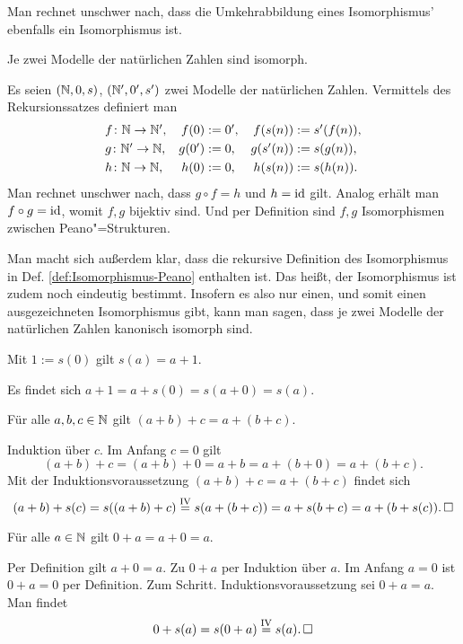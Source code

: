 \noindent
Man rechnet unschwer nach, dass die Umkehrabbildung eines Isomorphismus'
ebenfalls ein Isomorphismus ist.

\begin{Satz}\newlinefirst
Je zwei Modelle der natürlichen Zahlen sind isomorph.
\end{Satz}
\begin{Beweis}
Es seien $(\mathbb N,0,s)$, $(\mathbb N',0',s')$ zwei Modelle der natürlichen Zahlen.
Vermittels des Rekursionssatzes definiert man
\[\begin{array}{lr@{\;}lr@{\;}l}
f\colon\N\to\N', & f(0) &:= 0', & f(s(n)) &:= s'(f(n)),\\[3pt]
g\colon\N'\to\N, & g(0') &:= 0, & g(s'(n)) &:= s(g(n)),\\[3pt]
h\colon\N\to\N, & h(0) &:= 0, & h(s(n)) &:= s(h(n)).
\end{array}\]
Man rechnet unschwer nach, dass $g\circ f = h$ und $h = \operatorname{id}$ gilt.
Analog erhält man $f\circ g = \operatorname{id}$, womit $f,g$ bijektiv sind.
Und per Definition sind $f,g$ Isomorphismen zwischen Peano"=Strukturen.\,\qedsymbol
\end{Beweis}

\noindent
Man macht sich außerdem klar, dass die rekursive Definition des
Isomorphismus in Def. \ref{def:Isomorphismus-Peano} enthalten ist.
Das heißt, der Isomorphismus ist zudem noch eindeutig bestimmt.
Insofern es also nur einen, und somit einen ausgezeichneten Isomorphismus
gibt, kann man sagen, dass je zwei Modelle der natürlichen Zahlen
kanonisch isomorph sind.

\begin{Satz}
Mit $1:=s(0)$ gilt $s(a)=a+1$.
\end{Satz}
\begin{Beweis}
Es findet sich $a+1 = a+s(0) = s(a+0) = s(a)$.\,\qedsymbol
\end{Beweis}

\begin{Satz}\newlinefirst
Für alle $a,b,c\in\mathbb N$ gilt $(a+b)+c = a+(b+c)$.
\end{Satz}
\begin{Beweis}
Induktion über $c$. Im Anfang $c=0$ gilt
\[(a+b)+c = (a+b)+0 = a+b = a+(b+0) = a+(b+c).\]
Mit der Induktionsvoraussetzung $(a+b)+c = a+(b+c)$ findet sich
\[(a+b)+s(c) = s((a+b)+c) \stackrel{\mathrm{IV}}= s(a+(b+c))
= a+s(b+c) = a+(b+s(c)).\,\Box\]
\end{Beweis}

\begin{Satz}%
\label{nat-zero}\newlinefirst
Für alle $a\in\mathbb N$ gilt $0+a = a+0 = a$.
\end{Satz}
\begin{Beweis}
Per Definition gilt $a+0=a$. Zu $0+a$ per Induktion über $a$.
Im Anfang $a=0$ ist $0+a = 0$ per Definition. Zum Schritt.
Induktionsvoraussetzung sei $0+a=a$. Man findet
\[0+s(a) = s(0+a) \stackrel{\mathrm{IV}}= s(a).\,\Box\]
\end{Beweis}


